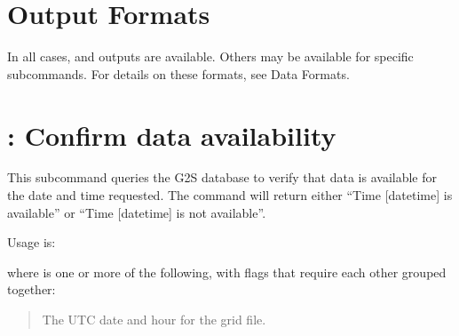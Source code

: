\documentclass[letterpaper,10pt,english]{sphinxmanual}
\begin{document}
\section{Output Formats}
\label{\detokenize{userguide:output-formats}}
\sphinxAtStartPar
In all cases,  and  outputs are available.  Others may be available for specific subcommands.  For details on these formats, see Data Formats.


\section{: Confirm data availability}
\label{\detokenize{userguide:checktime-confirm-data-availability}}
\sphinxAtStartPar
This subcommand queries the G2S database to verify that data is available for the date and time requested.  The command will return either “Time {[}datetime{]} is available” or “Time {[}datetime{]} is not available”.

\sphinxAtStartPar
Usage is:

\sphinxAtStartPar
{}

\sphinxAtStartPar
where \sphinxcode{\sphinxupquote{{[}flags{]}}} is one or more of the following, with flags that require each other grouped together:

\sphinxAtStartPar
{}
\begin{quote}

\sphinxAtStartPar
The UTC date and hour for the grid file.
\end{quote}
\begin{description}
\item[{}] \leavevmode
\sphinxAtStartPar
{}

\sphinxAtStartPar
{}

\end{description}
\end{document}

